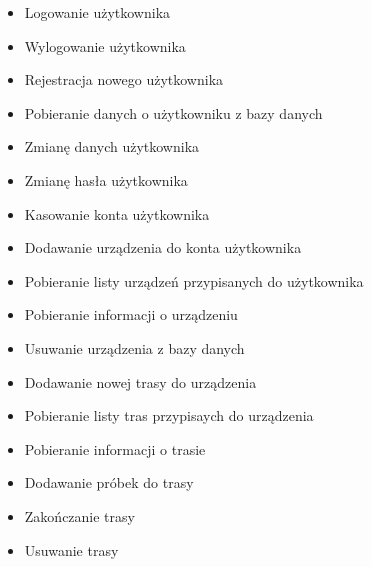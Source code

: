 \begin{itemize}
\item Logowanie użytkownika
\item Wylogowanie użytkownika
\item Rejestracja nowego użytkownika
\item Pobieranie danych o użytkowniku z bazy danych
\item Zmianę danych użytkownika
\item Zmianę hasła użytkownika
\item Kasowanie konta użytkownika
\item Dodawanie urządzenia do konta użytkownika
\item Pobieranie listy urządzeń przypisanych do użytkownika
\item Pobieranie informacji o urządzeniu
\item Usuwanie urządzenia z bazy danych
\item Dodawanie nowej trasy do urządzenia
\item Pobieranie listy tras przypisaych do urządzenia
\item Pobieranie informacji o trasie
\item Dodawanie próbek do trasy
\item Zakończanie trasy
\item Usuwanie trasy
\end{itemize}